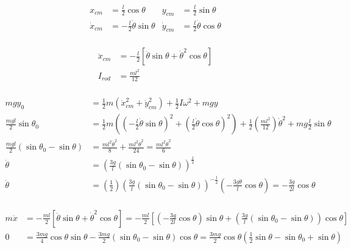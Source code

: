 \documentclass[]{article}
\begin{document}
	\begin{equation}
		\begin{aligned}
			x_{cm} &= \frac{l}{2} \cos \theta & y_{cm} &= \frac{l}{2} \sin \theta \\
			\dot{x}_{cm} &= -\frac{l}{2} \dot{\theta} \sin \theta & \dot{y}_{cm} &= \frac{l}{2} \dot{\theta} \cos \theta \\
		\end{aligned}
	\end{equation}

	\begin{equation}
		\begin{split}
			\ddot{x}_{cm} &= -\frac{l}{2} \left[ \ddot{\theta} \sin \theta + \dot{\theta}^2 \cos \theta \right] \\
			I_{rod} &= \frac{ml^2}{12} \\
		\end{split}
	\end{equation}

	\begin{equation}
		\begin{split}
			mgy_0 &= \frac{1}{2}m(\dot{x}^2_{cm} + \dot{y}^2_{cm}) + \frac{1}{2} I \omega^2 + mgy \\
			\frac{mgl}{2} \sin \theta_0 &= \frac{1}{2}m \left( (-\frac{l}{2} \dot{\theta} \sin \theta)^2 + (\frac{l}{2} \dot{\theta} \cos \theta)^2 \right) + \frac{1}{2} \left( \frac{ml^2}{12} \right) \dot{\theta}^2 + mg\frac{l}{2} \sin \theta \\
			\frac{mgl}{2} (\sin \theta_0 - \sin \theta) &= \frac{ml^2\dot{\theta}^2}{8} + \frac{ml^2\dot{\theta}^2}{24} = \frac{ml^2\dot{\theta}^2}{6} \\
			\dot{\theta} &= \left( \frac{3g}{l}(\sin \theta_0 - \sin \theta) \right)^\frac{1}{2} \\
			\ddot{\theta} &= \left( \frac{1}{2} \right) \left( \frac{3g}{l}(\sin \theta_0 - \sin \theta) \right)^{-\frac{1}{2}} \left( -\frac{3g\dot{\theta}}{l} \cos \theta \right) = -\frac{3g}{2l} \cos \theta \\
		\end{split}
	\end{equation}

	\begin{equation}
		\begin{split}
			m\ddot{x} &= -\frac{ml}{2} \left[ \ddot{\theta} \sin \theta + \dot{\theta}^2 \cos \theta \right] = -\frac{ml}{2} \left[ \left( -\frac{3g}{2l} \cos \theta \right) \sin \theta + \left( \frac{3g}{l}(\sin \theta_0 - \sin \theta) \right) \cos \theta \right] \\
			0 &= \frac{3mg}{4} \cos \theta \sin \theta - \frac{3mg}{2}(\sin \theta_0 - \sin \theta) \cos \theta = \frac{3mg}{2} \cos \theta \left( \frac{1}{2} \sin \theta - \sin \theta_0 + \sin \theta \right) \\
		\end{split}
	\end{equation}
\end{document}
